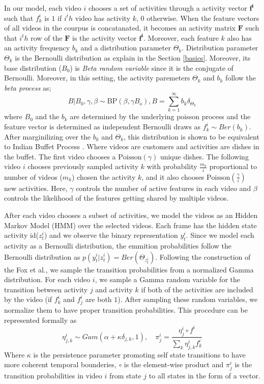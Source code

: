 In our model, each video $i$ chooses a set of activities through a activity vector $\mathbf{f^i}$ such that $f^i_k$ is $1$ if $i^th$ video has activity $k$, 0 otherwise. When the feature vectors of all videos in the courpus is concatanated, it becomes an activity matrix $\mathbf{F}$ such that $i^th$ row of the $\mathbf{F}$ is the activity vector $\mathbf{f^i}$. Moreover, each feature $k$ also has an activity frequency $b_k$  and a distribution parameter $\Theta_k$. Distribution parameter $\Theta_k$ is the Bernoulli distribution as explain in the Section \ref{basics}. Moreover, its base distribution ($B_0$) is \emph{Beta random variable} since it is the conjugate of Bernoulli.
 Moreover, in this setting, the activity paremeters $\Theta_k$ and $b_k$ follow the \emph{beta process} as;
\begin{equation}
  B|B_0,\gamma,\beta \sim \text{BP}(\beta,\gamma B_o), B=\sum_{k=1}^\infty b_k \delta_{\Theta_k}
\end{equation}
where $B_0$ and the $b_k$ are determined by the underlying poisson process \cite{ibp} and the feature vector is determined as independent Bernoulli draws as $f_{k}^i \sim Ber(b_k)$. After marginilizing over the $b_k$ and $\Theta_k$, this distribution is shown to be equivalent to Indian Buffet Process \cite{ibp}. Where videos are customers and activities are dishes in the buffet. The first video chooses a $\text{Poisson}(\gamma)$ unique dishes. The following video $i$ chooses previously sampled activity $k$ with probability $\frac{m_k}{i}$ proportional to number of videos ($m_k$) chosen the activity $k$, and it also chooses $\text{Poisson}(\frac{\gamma}{i})$ new activities. Here, $\gamma$ controls the number of active features in each video and $\beta$ controls the likelihood of the features getting shared by multiple videos.

After each video chooses a subset of activities, we model the videos as an Hidden Markov Model (HMM) over the selected videos. Each frame has the hidden state activity id($z^i_t$) and we observe the binary representation $y^i_t$. Since we model each activity as a Bernoulli distribution, the emmition probabilities follow the Bernoulli distribution as $p(y^i_t|z^i_t)=Ber(\Theta_{z^i_t})$. Following the construction of the Fox et al.\cite{foxBPHMM}, we sample the transition probabilities from a normalized Gamma distribution. For each video $i$, we sample a Gamma random variable for the transition between activity $j$ and activity $k$ if both of the activities are included by the video (if $f^i_k$ and $f^i_j$ are both $1$). After sampling these random variables, we normalize them to have proper transition probabilities. This procedure can be represented formally as
\begin{equation}
  \eta_{j,k}^i \sim Gam(\alpha+\kappa \delta_{j,k},1), \quad \pi_j^i = \frac{\eta^i_j \circ f^i}{\sum_k \eta^i_{j,k} f^i_k}
\end{equation}
Where $\kappa$ is the persistence parameter promoting self state transitions to have more coherent temporal bounderies, $\circ$ is the element-wise product and $\pi^i_j$ is the transition probabilities in video $i$ from state $j$ to all states in the form of a vector.

